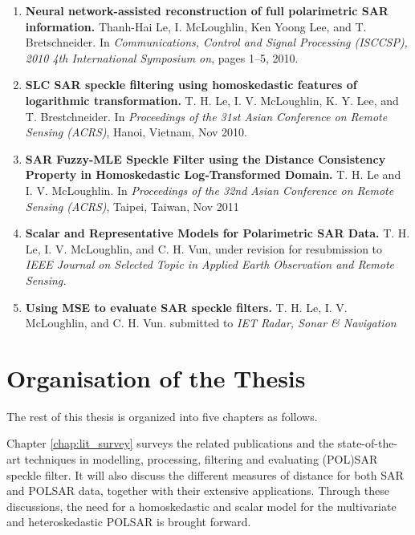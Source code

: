 \begin{enumerate}
\item \textbf{Neural network-assisted reconstruction of full polarimetric SAR information.}
  Thanh-Hai Le, I. McLoughlin, Ken Yoong Lee, and T. Bretschneider.
  In \textit{Communications, Control and Signal Processing (ISCCSP), 2010 4th International Symposium on}, pages 1–5, 2010.  \cite{Le_2010_ISCCSP} 
\item \textbf{SLC SAR speckle filtering using homoskedastic features of logarithmic transformation.}
  T. H. Le, I. V. McLoughlin, K. Y. Lee, and T. Brestchneider.
  In \textit{Proceedings of the 31st Asian Conference on Remote Sensing (ACRS)}, Hanoi, Vietnam, Nov 2010. \cite{Le_2010_ACRS}
\item  \textbf{SAR Fuzzy-MLE Speckle Filter using the Distance Consistency Property in Homoskedastic Log-Transformed Domain.}
  T. H. Le and I. V. McLoughlin. 
  In \textit{Proceedings of the 32nd Asian Conference on Remote Sensing (ACRS)}, Taipei, Taiwan, Nov 2011 \cite{Le_2011_ACRS}
\item \textbf{Scalar and Representative Models for Polarimetric SAR Data.}
  T. H. Le, I. V. McLoughlin, and C. H. Vun,
  under revision for resubmission to \textit{IEEE Journal on Selected Topic in Applied Earth Observation and Remote Sensing.}
\item \textbf{Using MSE to evaluate SAR speckle filters.}
  T. H. Le, I. V. McLoughlin, and C. H. Vun.
  submitted to \textit{IET Radar, Sonar \& Navigation}
\end{enumerate}
  

\section{Organisation of the Thesis}
The rest of this thesis is organized into five chapters as follows.

Chapter \ref{chap:lit_survey} surveys the related publications
  and the state-of-the-art techniques in modelling, processing, filtering and evaluating (POL)SAR speckle filter. %
It will also discuss the different measures of distance for both SAR and POLSAR data, together with their extensive applications. 
Through these discussions, the need for a homoskedastic and scalar model for the multivariate and heteroskedastic POLSAR is brought forward.


